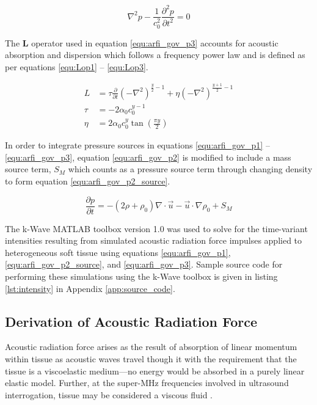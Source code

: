 			\begin{equation}
				\label{equ:wave_equation}
				\nabla^2 p - \frac{1}{c_0^2}\frac{\partial^2 p}{\partial t^2} = 0
			\end{equation}

			The $\mathbf{L}$ operator used in equation \ref{equ:arfi_gov_p3} accounts for acoustic absorption and dispersion which follows a frequency power law and is defined as per equations \ref{equ:Lop1} -- \ref{equ:Lop3}.

			\begin{subequations}
				\begin{align}
					L &= \tau \frac{\partial}{\partial t}\left(-\nabla^2\right)^{\frac{y}{2} - 1} + \eta \left(-\nabla^2\right)^{\frac{y+1}{2} - 1} \label{equ:Lop1} \\
					\tau &= -2\alpha_0 c_0^{y-1} \label{equ:Lop2} \\
					\eta &= 2\alpha_0c_0^y\tan\left(\frac{\pi y}{2}\right)  \label{equ:Lop3}
				\end{align}
			\end{subequations}

			In order to integrate pressure sources in equations \ref{equ:arfi_gov_p1} -- \ref{equ:arfi_gov_p3}, equation \ref{equ:arfi_gov_p2} is modified to include a mass source term, $S_M$ which counts as a pressure source term through changing density to form equation \ref{equ:arfi_gov_p2_source}.

			\begin{equation}
				\label{equ:arfi_gov_p2_source}
				\frac{\partial p}{\partial t} = -\left(2 \rho + \rho_0\right)\nabla \cdot \vec{u} - \vec{u} \cdot \nabla \rho_0 + S_M
			\end{equation}

			The k-Wave MATLAB\textsuperscript{\textregistered} toolbox version 1.0 was used to solve for the time-variant intensities resulting from simulated acoustic radiation force impulses applied to heterogeneous soft tissue using equations \ref{equ:arfi_gov_p1}, \ref{equ:arfi_gov_p2_source}, and \ref{equ:arfi_gov_p3}. Sample source code for performing these simulations using the k-Wave toolbox is given in listing \ref{lst:intensity} in Appendix \ref{app:source_code}.

		\subsection{Derivation of Acoustic Radiation Force}
			Acoustic radiation force arises as the result of absorption of linear momentum within tissue as acoustic waves travel though it with the requirement that the tissue is a viscoelastic medium---no energy would be absorbed in a purely linear elastic model. Further, at the super-\si{\MHz} frequencies involved in ultrasound interrogation, tissue may be considered a viscous fluid .

